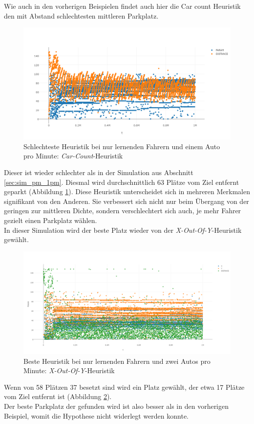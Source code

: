 Wie auch in den vorherigen Beispielen findet auch hier die Car count Heuristik den mit Abstand schlechtesten mittleren Parkplatz. 
\begin{figure}
	\includegraphics[width=\textwidth]{analyse/JustHeuristik/1pm/car1just.png}
	\caption{Schlechteste Heuristik bei nur lernenden Fahrern und einem Auto pro Minute: \emph{Car-Count}-Heuristik}\label{fig:res_jh_1pm_worst}
\end{figure}
Dieser ist wieder schlechter als in der Simulation aus Abschnitt \ref{sec:sim_pm_1pm}. Diesmal wird durchschnittlich 63 Plätze vom Ziel entfernt geparkt (Abbildung \ref{fig:res_jh_1pm_worst}). Diese Heuristik unterscheidet sich in mehreren Merkmalen signifikant von den Anderen. Sie verbessert sich nicht nur beim Übergang von der geringen zur mittleren Dichte, sondern verschlechtert sich auch, je mehr Fahrer gezielt einen Parkplatz wählen.\\
In dieser Simulation wird der beste Platz wieder von der \emph{X-Out-Of-Y}-Heuristik gewählt. 
\begin{figure}
	\includegraphics[width=\textwidth]{analyse/JustHeuristik/1pm/xy.png}
	\caption{Beste Heuristik bei nur lernenden Fahrern und zwei Autos pro Minute: \emph{X-Out-Of-Y}-Heuristik}\label{fig:res_jh_1pm_best}
\end{figure}
Wenn von 58 Plätzen 37 besetzt sind wird ein Platz gewählt, der etwa 17 Plätze vom Ziel entfernt ist (Abbildung \ref{fig:res_jh_1pm_best}). \\
Der beste Parkplatz der gefunden wird ist also besser als in den vorherigen Beispiel, womit die Hypothese nicht widerlegt werden konnte.\\


